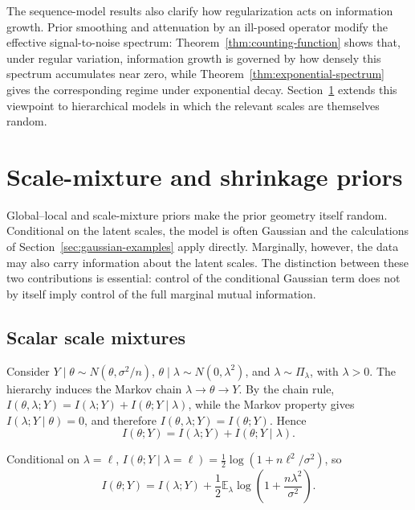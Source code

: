 \documentclass[11pt]{article}
\theoremstyle{plain}
\theoremstyle{definition}
\theoremstyle{remark}
\newcommand{\E}{\mathbb{E}}
\begin{document}
The sequence-model results also clarify how regularization acts on information growth. Prior smoothing and attenuation by an ill-posed operator modify the effective signal-to-noise spectrum: Theorem~\ref{thm:counting-function} shows that, under regular variation, information growth is governed by how densely this spectrum accumulates near zero, while Theorem~\ref{thm:exponential-spectrum} gives the corresponding regime under exponential decay. Section~\ref{sec:shrinkage} extends this viewpoint to hierarchical models in which the relevant scales are themselves random.


\section{Scale-mixture and shrinkage priors}
\label{sec:shrinkage}

Global--local and scale-mixture priors make the prior geometry itself random. Conditional on the latent scales, the model is often Gaussian and the calculations of Section~\ref{sec:gaussian-examples} apply directly. Marginally, however, the data may also carry information about the latent scales. The distinction between these two contributions is essential: control of the conditional Gaussian term does not by itself imply control of the full marginal mutual information.

\subsection{Scalar scale mixtures}
\label{subsec:gl-priors}

Consider \(Y\mid\theta\sim N(\theta,\sigma^2/n)\), \(\theta\mid\lambda\sim N(0,\lambda^2)\), and \(\lambda\sim\Pi_\lambda\), with \(\lambda>0\). The hierarchy induces the Markov chain \(\lambda\longrightarrow\theta\longrightarrow Y\). By the chain rule, \(I(\theta,\lambda;Y)=I(\lambda;Y)+I(\theta;Y\mid\lambda)\), while the Markov property gives \(I(\lambda;Y\mid\theta)=0\), and therefore \(I(\theta,\lambda;Y)=I(\theta;Y)\). Hence
\begin{equation}
	\label{eq:shrinkage-mi-decomposition}
	I(\theta;Y)=I(\lambda;Y)+I(\theta;Y\mid\lambda).
\end{equation}

Conditional on \(\lambda=\ell\), \(I(\theta;Y\mid\lambda=\ell)=\frac12\log(1+n\ell^2/\sigma^2)\), so
\begin{equation}
	\label{eq:conditional-shrinkage-mi}
	I(\theta;Y)
	=
	I(\lambda;Y)
	+
	\frac12\E_\lambda
	\log\left(1+\frac{n\lambda^2}{\sigma^2}\right).
\end{equation}
\end{document}
